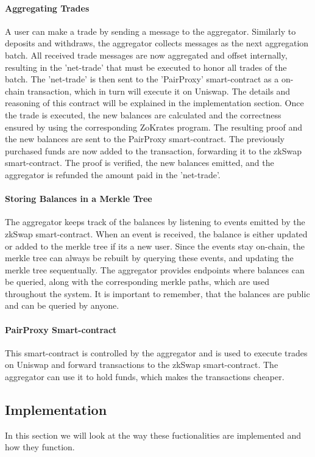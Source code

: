\documentclass[../../thesis.tex]{subfiles}
\begin{document}
\paragraph{Aggregating Trades}
A user can make a trade by sending a message to the aggregator. Similarly to deposits and withdraws, the aggregator collects messages as the next aggregation batch. All received trade messages are now aggregated and offset internally, resulting in the 'net-trade' that must be executed to honor all trades of the batch. The 'net-trade' is then sent to the 'PairProxy' smart-contract as a on-chain transaction, which in turn will execute it on Uniswap. The details and reasoning of this contract will be explained in the implementation section. Once the trade is executed, the new balances are calculated and the correctness ensured by using the corresponding ZoKrates program. The resulting proof and the new balances are sent to the PairProxy smart-contract. The previously purchased funds are now added to the transaction, forwarding it to the zkSwap smart-contract. The proof is verified, the new balances emitted, and the aggregator is refunded the amount paid in the 'net-trade'. 

\paragraph{Storing Balances in a Merkle Tree}
The aggregator keeps track of the balances by listening to events emitted by the zkSwap smart-contract. When an event is received, the balance is either updated or added to the merkle tree if its a new user. Since the events stay on-chain, the merkle tree can always be rebuilt by querying these events, and updating the merkle tree sequentually. The aggregator provides endpoints where balances can be queried, along with the corresponding merkle paths, which are used throughout the system. It is important to remember, that the balances are public and can be queried by anyone.

\paragraph{PairProxy Smart-contract}
This smart-contract is controlled by the aggregator and is used to execute trades on Uniswap and forward transactions to the zkSwap smart-contract. The aggregator can use it to hold funds, which makes the transactions cheaper. 


\subsection{Implementation}
In this section we will look at the way these fuctionalities are implemented and how they function. 
\end{document}
